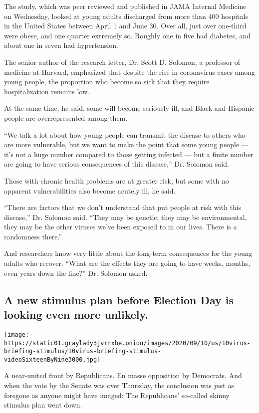 The study, which was peer reviewed and published in JAMA Internal
Medicine on Wednesday, looked at young adults discharged from more than
400 hospitals in the United States between April 1 and June 30. Over
all, just over one-third were obese, and one quarter extremely so.
Roughly one in five had diabetes, and about one in seven had
hypertension.

The senior author of the research letter, Dr. Scott D. Solomon, a
professor of medicine at Harvard, emphasized that despite the rise in
coronavirus cases among young people, the proportion who become so sick
that they require hospitalization remains low.

At the same time, he said, some will become seriously ill, and Black and
Hispanic people are overrepresented among them.

``We talk a lot about how young people can transmit the disease to
others who are more vulnerable, but we want to make the point that some
young people --- it's not a huge number compared to those getting
infected --- but a finite number are going to have serious consequences
of this disease,'' Dr. Solomon said.

Those with chronic health problems are at greater risk, but some with no
apparent vulnerabilities also become acutely ill, he said.

``There are factors that we don't understand that put people at risk
with this disease,'' Dr. Solomon said. ``They may be genetic, they may
be environmental, they may be the other viruses we've been exposed to in
our lives. There is a randomness there.''

And researchers know very little about the long-term consequences for
the young adults who recover. ``What are the effects they are going to
have weeks, months, even years down the line?'' Dr. Solomon asked.

\hypertarget{a-new-stimulus-plan-before-election-day-is-looking-even-more-unlikely}{%
\subsection{A new stimulus plan before Election Day is looking even more
unlikely.}\label{a-new-stimulus-plan-before-election-day-is-looking-even-more-unlikely}}

\texttt{[image: https://static01.graylady3jvrrxbe.onion/images/2020/09/10/us/10virus-briefing-stimulus/10virus-briefing-stimulus-videoSixteenByNine3000.jpg]}

A near-united front by Republicans. En masse opposition by Democrats.
And when the vote by the Senate was over Thursday, the conclusion was
just as foregone as anyone might have imaged: The Republicans' so-called
skinny stimulus plan went down.

